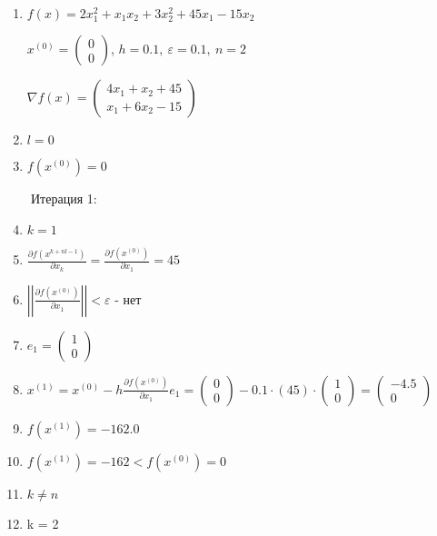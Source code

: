\documentclass{article}
\begin{document}
\begin{enumerate}
    \item
        $f(x) = 2x_1^2 + x_1x_2 + 3x_2^2 + 45x_1 - 15x_2$
        
        $x^{(0)} = \begin{pmatrix} 0 \\ 0 \end{pmatrix}$, 
        $h = 0.1, \ \varepsilon = 0.1, \ n = 2$
        
        $\nabla f(x) =
        \begin{pmatrix}
            4x_1 + x_2 + 45 \\
            x_1 + 6x_2 - 15
        \end{pmatrix}$
    \item $l = 0$
    \item $f(x^{(0)}) = 0$
\end{enumerate}

\ \ \ \ Итерация 1:

\begin{enumerate}
    \setcounter{enumi}{3}
    \item $k = 1$
    \item $\frac{\partial f(x^{k+nl-1})}{\partial x_k} = \frac{\partial f(x^{(0)})}{\partial x_1} = 45$
    \item $\left|\left|\frac{\partial f(x^{(0)})}{\partial x_1}\right|\right| < \varepsilon$ - нет
    \item $e_{1} = \begin{pmatrix} 1 \\ 0 \end{pmatrix}$
    \item $x^{(1)} = x^{(0)} - h \frac{\partial f(x^{(0)})}{\partial x_1} e_1 = 
        \begin{pmatrix} 0 \\ 0 \end{pmatrix} - 0.1 \cdot (45) \cdot \begin{pmatrix} 1 \\ 0 \end{pmatrix} = 
        \begin{pmatrix} -4.5 \\ 0 \end{pmatrix}$
    \item $f(x^{(1)}) = -162.0$
    \item $f(x^{(1)}) = -162 < f(x^{(0)}) = 0$
    \item $k \ne n$
    \item k = 2
\end{enumerate}
\end{document}
